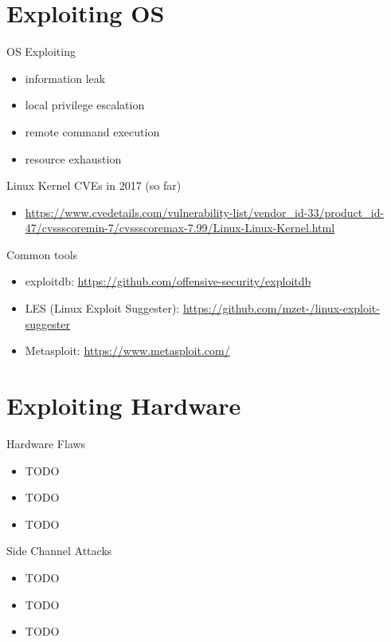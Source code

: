 \documentclass{curs}
\begin{document}
\section{Exploiting OS}

\begin{frame}{OS Exploiting}
  \begin{itemize}
    \item information leak
    \item local privilege escalation
    \item remote command execution
    \item resource exhaustion
  \end{itemize}
\end{frame}

\begin{frame}{Linux Kernel CVEs in 2017 (so far)}
  \begin{itemize}
    \item \url{https://www.cvedetails.com/vulnerability-list/vendor_id-33/product_id-47/cvssscoremin-7/cvssscoremax-7.99/Linux-Linux-Kernel.html}
  \end{itemize}
\end{frame}

\begin{frame}{Common tools}
  \begin{itemize}
    \item exploitdb: \url{https://github.com/offensive-security/exploitdb}
    \item LES (Linux Exploit Suggester): \url{https://github.com/mzet-/linux-exploit-suggester}
    \item Metasploit: \url{https://www.metasploit.com/}
  \end{itemize}
\end{frame}


\section{Exploiting Hardware}

\begin{frame}{Hardware Flaws}
  \begin{itemize}
    \item TODO
    \item TODO
    \item TODO
  \end{itemize}
\end{frame}

\begin{frame}{Side Channel Attacks}
  \begin{itemize}
    \item TODO
    \item TODO
    \item TODO
  \end{itemize}
\end{frame}
\end{document}
